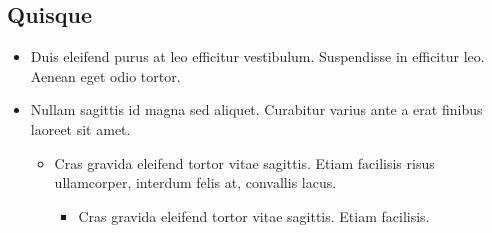\documentclass[header]{nosvagor-notes}
\begin{document}
\begin{itemize}
\begin{itemize}
\begin{itemize}
\begin{itemize}
          \end{itemize}
      \end{itemize}
  \end{itemize}

  \subsection{Quisque}
  \begin{itemize}
    \item Duis eleifend purus at leo efficitur vestibulum. Suspendisse in
      efficitur leo. Aenean eget odio tortor.

    \item Nullam sagittis id magna sed aliquet. Curabitur varius ante a erat
      finibus laoreet sit amet.
      \begin{itemize}
        \item Cras gravida eleifend tortor vitae sagittis. Etiam facilisis
          risus ullamcorper, interdum felis at, convallis lacus.
          \begin{itemize}
            \item Cras gravida eleifend tortor vitae sagittis. Etiam facilisis.

          \end{itemize}
      \end{itemize}
  \end{itemize}

\end{itemize}
\end{document}
